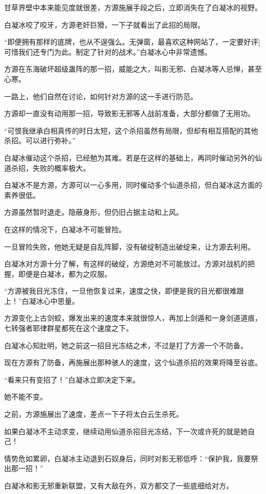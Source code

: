\begin{this_body}
甘草界壁中本来能见度就很差，方源施展手段之后，立即消失在了白凝冰的视野。

白凝冰咬了咬牙，方源老奸巨猾，一下子就看出了此招的局限。

“即便拥有那样的底牌，也从不逞强么。无弹窗，最喜欢这种网站了，一定要好评]可惜我们还专门为此。制定了针对的战术。”白凝冰心中非常遗憾。

方源在东海破坏超级蛊阵的那一招，威能之大，叫影无邪、白凝冰等人忌惮，甚至心寒。

一路上，他们自然在讨论，如何针对方源的这一手进行防范。

方源却一直没有动用那一招，导致影无邪等人战前准备，大部分都做了无用功。

“可恨我继承白相真传的时日太短，这个杀招虽然有局限，但却有相互搭配的其他杀招。可以进行弥补。”

白凝冰催动这个杀招，已经勉为其难。若是在这样的基础上，再同时催动另外的仙道杀招，失败的概率极大。

白凝冰不是方源，方源可以一心多用，同时催动多个仙道杀招，但白凝冰这方面的素养很低。

方源虽然暂时退走。隐蔽身形，但仍旧占据主动和上风。

在这样的情况下，白凝冰不可能冒险。

一旦冒险失败，他她无疑是自乱阵脚，没有破绽制造出破绽来，让方源去利用。

白凝冰对方源十分了解，有这样的破绽，方源绝对不可能放过。方源对战机的把握，即便是白凝冰，都为之叹服。

“方源被我目光冻住，一旦他恢复过来，速度之快，即便是我的目光都很难跟上！”白凝冰心中思量。

方源变化上古剑蛟，爆发出来的速度本来就很惊人，再加上剑遁和一身剑道道痕，七转强者耶律群星都死在这个速度之下。

白凝冰心知肚明，她之前这一招目光冻结之术，不过是打了方源一个不防备。

现在方源有了防备，再施展出那种骇人的速度，这个仙道杀招的效果将降至谷底。

“看来只有变招了！”白凝冰立即决定下来。

她不能不变。

之前，方源施展出了速度，差点一下子将太白云生杀死。

如果白凝冰不主动求变，继续动用仙道杀招目光冻结，下一次或许死的就是她自己！

情势危如累卵，白凝冰主动退到石奴身后，同时对影无邪低呼：“保护我，我要祭出那一招！”

白凝冰和影无邪重新联盟，又有大敌在外，双方都交了一些底细给对方。


\end{this_body}
